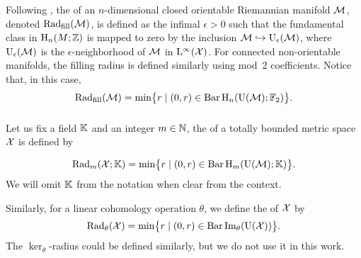 Following \cite{gromov1983filling}, the  of an \(n\)-dimensional closed orientable Riemannian manifold $\cM$, denoted \(\fillrad(\cM)\), is defined as the infimal $\epsilon > 0$ such that the fundamental class in $\rH_n(M; \Z)$ is mapped to zero by the inclusion $\cM \hookrightarrow \rU_\epsilon(\cM)$, where \(\rU_\epsilon(\cM)\) is the \(\epsilon\)-neighborhood of \(\cM\) in \(\rL^\infty(\cX)\).
For connected non-orientable manifolds, the filling radius is defined similarly using mod~2 coefficients.
Notice that, in this case,
\[
\fillrad(\cM) = \min\set[\big]{r \mid (0, r) \in \barc \rH_n(\rU(\cM); \Ftwo)}.
\]

\subsubsection{}

Let us fix a field \(\bK\) and an integer \(m \in \N\), the  of a totally bounded metric space \(\cX\) is defined by

\[
\firstdeath{m}{\cX; \bK} = \min\set[\big]{r \mid (0, r) \in \barc \rH_m(\rU(\cM); \bK)}.
\]
We will omit \(\bK\) from the notation when clear from the context.

Similarly, for a linear cohomology operation \(\theta\), we define the  of \(\cX\) by
\[
\firstdeath{\theta}{\cX} = \min\set[\big]{r \mid (0, r) \in \barc \img_\theta(\rU(\cX))}.
\]
The \(\ker_\theta\)-radius could be defined similarly, but we do not use it in this work.



%

